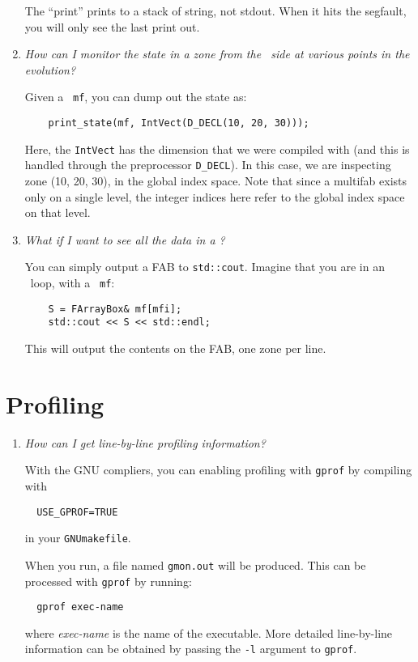 \begin{enumerate}
    The ``print'' prints to a stack of string, not stdout.  When it
    hits the segfault, you will only see the last print out.



\item {\em How can I monitor the state in a zone from the \cpp\ side
  at various points in the evolution?}

  Given a \multifab\ {\tt mf}, you can dump out the state as:
\begin{verbatim}
    print_state(mf, IntVect(D_DECL(10, 20, 30)));
\end{verbatim}
  Here, the {\tt IntVect} has the dimension that we were compiled with
  (and this is handled through the preprocessor {\tt D\_DECL}).  In
  this case, we are inspecting zone (10, 20, 30), in the global index
  space.  Note that since a multifab exists only on a single level, the
  integer indices here refer to the global index space on that level.


\item {\em What if I want to see all the data in a \farraybox?}

  You can simply output a FAB to {\tt std::cout}.  Imagine that you
  are in an \mfiter\ loop, with a \multifab\ {\tt mf}:
\begin{verbatim}
    S = FArrayBox& mf[mfi];
    std::cout << S << std::endl;
\end{verbatim}
  This will output the contents on the FAB, one zone per line.

\end{enumerate}


\section{Profiling}

\begin{enumerate}

\item {\em How can I get line-by-line profiling information?}

  With the GNU compliers, you can enabling profiling with {\tt gprof}
  by compiling with
\begin{verbatim}
  USE_GPROF=TRUE
\end{verbatim}
  in your {\tt GNUmakefile}.

  When you run, a file named {\tt gmon.out} will be produced.  This can
  be processed with {\tt gprof} by running:
\begin{verbatim}
  gprof exec-name
\end{verbatim}
  where {\em exec-name} is the name of the executable.  More detailed
  line-by-line information can be obtained by passing the {\tt -l}
  argument to {\tt gprof}.

\end{enumerate}


